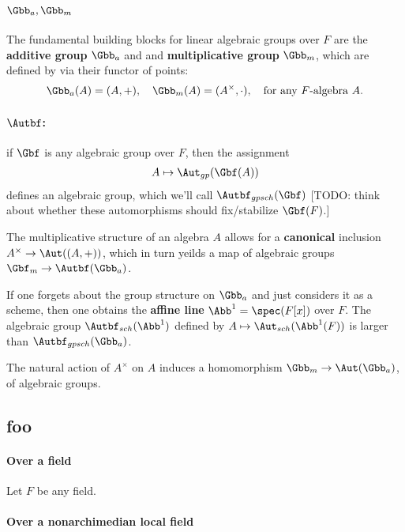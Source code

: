 \paragraph{$\Gbb_a,\Gbb_m$} The fundamental building blocks for linear algebraic groups over $F$ are the \textbf{additive group} $\Gbb_a$ and and \textbf{multiplicative group} $\Gbb_m$, which are defined by via their functor of points:
\begin{align}
    \Gbb_a(A)= (A,+),\quad \Gbb_m(A)=(A^\times,\cdot), \quad \text{for any $F$-algebra $A$.}
\end{align}

\paragraph{$\Autbf$:} if $\Gbf$ is any algebraic group over $F$, then the assignment
\begin{align}
    A\mapsto \Aut_{gp}(\Gbf(A))
\end{align}
defines an algebraic group, which we'll call $\Autbf_{gpsch}(\Gbf)$ [TODO: think about whether these automorphisms should fix/stabilize $\Gbf(F)$.]

The multiplicative structure of an algebra $A$ allows for a \textbf{canonical} inclusion $A^\times \to \Aut((A,+))$, which in turn yeilds a map of algebraic groups $\Gbf_m \to \Autbf(\Gbb_a)$.
\begin{rem}
    If one forgets about the group structure on $\Gbb_a$ and just considers it as a scheme, then one obtains the \textbf{affine line} $\Abb^1 = \spec(F[x])$  over $F$. The algebraic group $\Autbf_{sch}(\Abb^1)$ defined by $A \mapsto \Aut_{sch}(\Abb^1(F))$ is larger than $\Autbf_{gpsch}(\Gbb_a)$.
\end{rem}

The natural action of $A^\times$ on $A$ induces a homomorphism $\Gbb_m \to \Aut(\Gbb_a)$, of algebraic groups.
\subsection{foo}
\paragraph{Over a field}
Let $F$ be any field.

\paragraph{Over a nonarchimedian local field}

